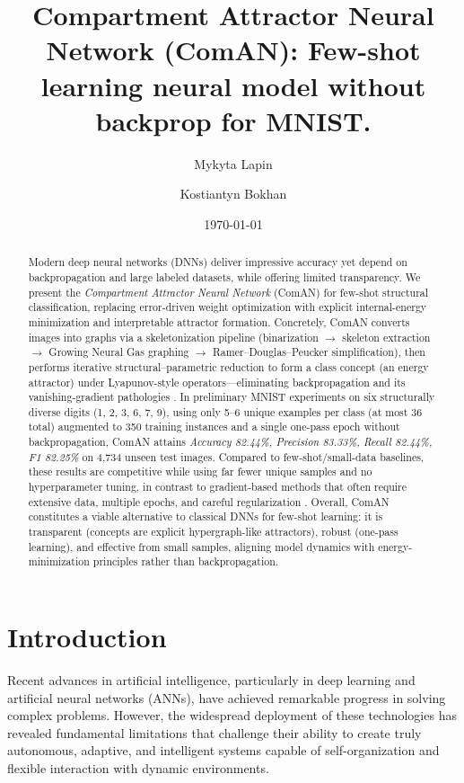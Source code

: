 \documentclass[12pt, a4paper]{article}
\title{\textbf{Compartment Attractor Neural Network (ComAN):} Few-shot learning neural model without backprop for MNIST.}
\author{Mykyta Lapin \and Kostiantyn Bokhan}
\date{\today}
\begin{document}
\maketitle

\begin{abstract}
    Modern deep neural networks (DNNs) deliver impressive accuracy yet depend on backpropagation and large labeled datasets, while offering limited transparency. We present the \emph{Compartment Attractor Neural Network} (ComAN) for few-shot structural classification, replacing error-driven weight optimization with explicit internal-energy minimization and interpretable attractor formation. Concretely, ComAN converts images into graphs via a skeletonization pipeline (binarization $\rightarrow$ skeleton extraction $\rightarrow$ Growing Neural Gas graphing $\rightarrow$ Ramer–Douglas–Peucker simplification), then performs iterative structural–parametric reduction to form a class concept (an energy attractor) under Lyapunov-style operators—eliminating backpropagation and its vanishing-gradient pathologies \cite{rumelhart1986,hochreiter2001}. In preliminary MNIST experiments on six structurally diverse digits (1, 2, 3, 6, 7, 9), using only 5–6 unique examples per class (at most 36 total) augmented to 350 training instances and a single one-pass epoch without backpropagation, ComAN attains \emph{Accuracy 82.44\%, Precision 83.33\%, Recall 82.44\%, F1 82.25\%} on 4{,}734 unseen test images. Compared to few-shot/small-data baselines, these results are competitive while using far fewer unique samples and no hyperparameter tuning, in contrast to gradient-based methods that often require extensive data, multiple epochs, and careful regularization \cite{dietterich1995,lipton2018,kaplan2020,crick1989}. Overall, ComAN constitutes a viable alternative to classical DNNs for few-shot learning: it is transparent (concepts are explicit hypergraph-like attractors), robust (one-pass learning), and effective from small samples, aligning model dynamics with energy-minimization principles rather than backpropagation.
\end{abstract}

\newpage

\section{Introduction}

Recent advances in artificial intelligence, particularly in deep learning and artificial neural networks (ANNs), have achieved remarkable progress in solving complex problems. However, the widespread deployment of these technologies has revealed fundamental limitations that challenge their ability to create truly autonomous, adaptive, and intelligent systems capable of self-organization and flexible interaction with dynamic environments.
\end{document}
